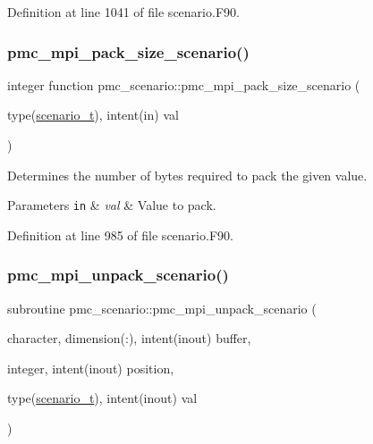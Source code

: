 Definition at line 1041 of file scenario.\+F90.

\mbox{\label{namespacepmc__scenario_a135753482d6e0a63cf3947e6e017c618}} 
\subsubsection{\texorpdfstring{pmc\+\_\+mpi\+\_\+pack\+\_\+size\+\_\+scenario()}{pmc\_mpi\_pack\_size\_scenario()}}
{\footnotesize\ttfamily integer function pmc\+\_\+scenario\+::pmc\+\_\+mpi\+\_\+pack\+\_\+size\+\_\+scenario (\begin{DoxyParamCaption}\item[{type(\mbox{\hyperlink{structpmc__scenario_1_1scenario__t}{scenario\+\_\+t}}), intent(in)}]{val }\end{DoxyParamCaption})}



Determines the number of bytes required to pack the given value. 


\begin{DoxyParams}[1]{Parameters}
\mbox{\tt in}  & {\em val} & Value to pack. \\
\hline
\end{DoxyParams}


Definition at line 985 of file scenario.\+F90.

\mbox{\label{namespacepmc__scenario_afddd83d6cfc65b32e3cce01d70ecdf85}} 
\subsubsection{\texorpdfstring{pmc\+\_\+mpi\+\_\+unpack\+\_\+scenario()}{pmc\_mpi\_unpack\_scenario()}}
{\footnotesize\ttfamily subroutine pmc\+\_\+scenario\+::pmc\+\_\+mpi\+\_\+unpack\+\_\+scenario (\begin{DoxyParamCaption}\item[{character, dimension(\+:), intent(inout)}]{buffer,  }\item[{integer, intent(inout)}]{position,  }\item[{type(\mbox{\hyperlink{structpmc__scenario_1_1scenario__t}{scenario\+\_\+t}}), intent(inout)}]{val }\end{DoxyParamCaption})}



